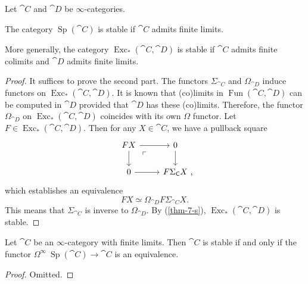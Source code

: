 \begin{theorem}
    Let $\cat{C}$ and $\cat{D}$ be $\infty$-categories.

    \begin{itms}
        \item
        The category $\operatorname{Sp}(\cat{C})$ is stable
        if $\cat{C}$ admits finite limits.

        \item
        More generally, the category $\operatorname{Exc}_*(\cat{C},\cat{D})$
        is stable if $\cat{C}$ admits finite colimits and 
        $\cat{D}$ admits finite limits.
    \end{itms}
\end{theorem}

\begin{proof}
    It suffices to prove the second part.
    The functors $\Sigma_{\cat{C}}$ and $\Omega_{\cat{D}}$
    induce functors on $\operatorname{Exc}_*(\cat{C},\cat{D})$.
    It is known that (co)limits in $\operatorname{Fun}(\cat{C},\cat{D})$
    can be computed in $\cat{D}$ provided that $\cat{D}$ has these (co)limits.
    Therefore, the functor $\Omega_{\cat{D}}$ on $\operatorname{Exc}_*(\cat{C},\cat{D})$
    coincides with its own $\Omega$ functor.
    Let $F\in\operatorname{Exc}_*(\cat{C},\cat{D})$.
    Then for any $X\in\cat{C}$, we have a pullback square 
    \[\begin{tikzcd}
        FX \ar[r] \ar[d] \ar[dr,phantom,pos=.25,"\ulcorner"] & 0\ar[d] \\
        0\ar[r] & F\Sigma_{\cat{C}}X \rlap{\ ,}
    \end{tikzcd}\]
    which establishes an equivalence
    \[ FX \simeq \Omega_{\cat{D}}F\Sigma_{\cat{C}}X. \]
    This means that $\Sigma_{\cat{C}}$ is inverse to $\Omega_{\cat{D}}$.
    By (\ref{thm-7-s}), $\operatorname{Exc}_*(\cat{C},\cat{D})$
    is stable.
\end{proof}

\begin{proposition}
    Let $\cat{C}$ be an $\infty$-category with finite limits.
    Then $\cat{C}$ is stable if and only if the functor 
    $\Omega^\infty\:\operatorname{Sp}(\cat{C})\to\cat{C}$
    is an equivalence.
\end{proposition}

\begin{proof}
    Omitted. 
\end{proof}

